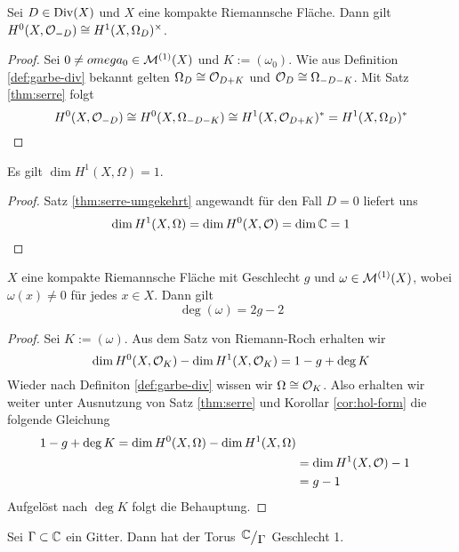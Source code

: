 \begin{thm}
  \label{thm:serre-umgekehrt}
  Sei $D \in \operatorname{Div}(X)$ und $X$ eine kompakte Riemannsche Fläche. Dann
  gilt $H^0(X, \mathcal{O}_{-D}) \cong H^1(X, \Omega_D)^\times$.
\end{thm}

\begin{proof}
  Sei $0 \neq omega_0 \in \mathcal{M}^{(1)}(X)$ und $K := (\omega_0)$. Wie
  aus Definition \ref{def:garbe-div} bekannt gelten $\Omega_D \cong
  \mathcal{O}_{D+K}$ und $\mathcal{O}_D \cong \Omega_{-D-K}$. Mit Satz
  \ref{thm:serre} folgt
  \[
  H^0(X, \mathcal{O}_{-D}) \cong H^0(X, \Omega_{-D-K}) \cong H^1(X,
  \mathcal{O}_{D+K})^\ast = H^1(X, \Omega_D)^\ast
  \]
\end{proof}

\begin{cor}
  \label{cor:hol-form}
  Es gilt $\dim H^1(X, \Omega) = 1$.
\end{cor}

\begin{proof}
  Satz \ref{thm:serre-umgekehrt} angewandt für den Fall $D = 0$
  liefert uns
  \[
  \dim H^1(X, \Omega) = \dim H^0(X, \mathcal{O}) = \dim \mathbb{C} = 1
  \]
\end{proof}

\begin{thm}
  \label{thm:deg-geschlecht}
  $X$ eine kompakte Riemannsche Fläche mit Geschlecht $g$ und $\omega
  \in \mathcal{M}^{(1)}(X)$, wobei $\omega(x) \neq 0$ für jedes $x \in
  X$. Dann gilt
  \[
  \deg(\omega) = 2g - 2
  \]
\end{thm}

\begin{proof}
  Sei $K := (\omega)$. Aus dem Satz von Riemann-Roch erhalten wir
  \[
  \dim H^0(X, \mathcal{O}_K) - \dim H^1(X, \mathcal{O}_K) = 1 - g + \deg K
  \]
  Wieder nach Definiton \ref{def:garbe-div} wissen wir $\Omega \cong
  \mathcal{O}_K$. Also erhalten wir weiter unter Ausnutzung von Satz
  \ref{thm:serre} und Korollar \ref{cor:hol-form} die folgende Gleichung
  \begin{align*}
    1 - g+ \deg K = \dim H^0(X, \Omega) - \dim H^1(X, \Omega) \\
    & = \dim H^1(X, \mathcal{O}) - 1 \\
    & = g - 1
  \end{align*}
  Aufgelöst nach $\deg K$ folgt die Behauptung.
\end{proof}

\begin{cor}
  \label{cor:torus-geschlecht}
  Sei $\Gamma \subset \mathbb{C}$ ein Gitter. Dann hat der Torus
  $\quot{\C}{\Gamma}$ Geschlecht 1.
\end{cor}

